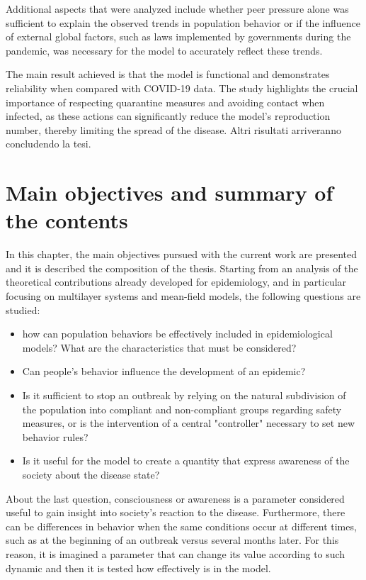 Additional aspects that were analyzed include whether peer pressure alone was sufficient to explain the observed trends in population behavior or if the influence of external global factors, such as laws implemented by governments during the pandemic, was necessary for the model to accurately reflect these trends.

The main result achieved is that the model is functional and demonstrates reliability when compared with COVID-19 data. The study highlights the crucial importance of respecting quarantine measures and avoiding contact when infected, as these actions can significantly reduce the model's reproduction number, thereby limiting the spread of the disease. Altri risultati arriveranno concludendo la tesi.

\chapter{Main objectives and summary of the contents}

In this chapter, the main objectives pursued with the current work are presented and it is described the composition of the thesis. 
Starting from an analysis of the theoretical contributions already developed for epidemiology, and in particular focusing on multilayer systems and mean-field models, the following questions are studied:

\begin{itemize}
	\item how can population behaviors be effectively included in epidemiological models? What are the characteristics that must be considered?
	\item Can people's behavior influence the development of an epidemic?
	\item Is it sufficient to stop an outbreak by relying on the natural subdivision of the population into compliant and non-compliant groups regarding safety measures, or is the intervention of a central "controller" necessary to set new behavior rules?
	\item Is it useful for the model to create a quantity that express awareness of the society about the disease state? 
\end{itemize}
About the last question, consciousness or awareness is a parameter considered useful to gain insight into society's reaction to the disease. Furthermore, there can be differences in behavior when the same conditions occur at different times, such as at the beginning of an outbreak versus several months later. For this reason, it is imagined a parameter that can change its value according to such dynamic and then it is tested how effectively is in the model. 


